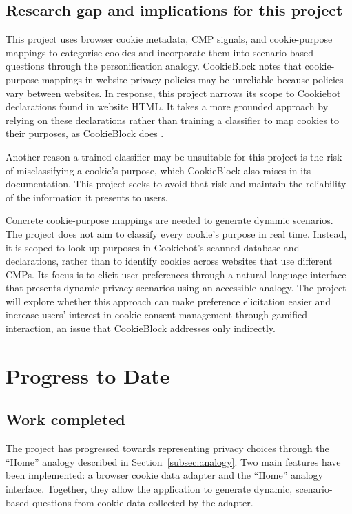 \documentclass[11pt,a4paper]{report}
\begin{document}
\section{Research gap and implications for this project}
This project uses browser cookie metadata, CMP signals, and cookie-purpose mappings to categorise cookies and incorporate them into scenario-based questions through the personification analogy. CookieBlock notes that cookie-purpose mappings in website privacy policies may be unreliable because policies vary between websites. In response, this project narrows its scope to Cookiebot declarations found in website HTML. It takes a more grounded approach by relying on these declarations rather than training a classifier to map cookies to their purposes, as CookieBlock does \cite{cybotCookieDeclaration,cookiebotCookieScripts}.

Another reason a trained classifier may be unsuitable for this project is the risk of misclassifying a cookie's purpose, which CookieBlock also raises in its documentation. This project seeks to avoid that risk and maintain the reliability of the information it presents to users.

Concrete cookie-purpose mappings are needed to generate dynamic scenarios. The project does not aim to classify every cookie's purpose in real time. Instead, it is scoped to look up purposes in Cookiebot's scanned database and declarations, rather than to identify cookies across websites that use different CMPs. Its focus is to elicit user preferences through a natural-language interface that presents dynamic privacy scenarios using an accessible analogy. The project will explore whether this approach can make preference elicitation easier and increase users' interest in cookie consent management through gamified interaction, an issue that CookieBlock addresses only indirectly.

\chapter{Progress to Date}
\section{Work completed}
The project has progressed towards representing privacy choices through the ``Home'' analogy described in Section~\ref{subsec:analogy}. Two main features have been implemented: a browser cookie data adapter and the ``Home'' analogy interface. Together, they allow the application to generate dynamic, scenario-based questions from cookie data collected by the adapter.
\end{document}
